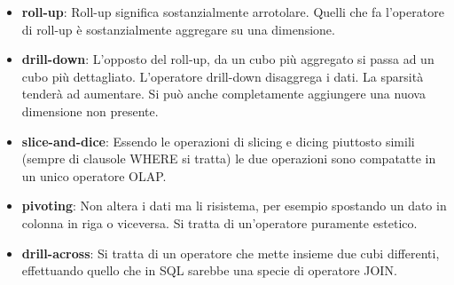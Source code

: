 \begin{itemize}
	\item \textbf{roll-up}: Roll-up significa sostanzialmente arrotolare. Quelli che fa l'operatore di roll-up è sostanzialmente aggregare su una dimensione.
	\item \textbf{drill-down}: L'opposto del roll-up, da un cubo più aggregato si passa ad un cubo più dettagliato. L'operatore drill-down disaggrega i dati. La sparsità tenderà ad aumentare. Si può anche completamente aggiungere una nuova dimensione non presente.
	\item \textbf{slice-and-dice}: Essendo le operazioni di slicing e dicing piuttosto simili (sempre di clausole WHERE si tratta) le due operazioni sono compatatte in un unico operatore OLAP.
	\item \textbf{pivoting}: Non altera i dati ma li risistema, per esempio spostando un dato in colonna in riga o viceversa. Si tratta di un'operatore puramente estetico.
	\item \textbf{drill-across}: Si tratta di un operatore che mette insieme due cubi differenti, effettuando quello che in SQL sarebbe una specie di operatore JOIN.
\end{itemize}

